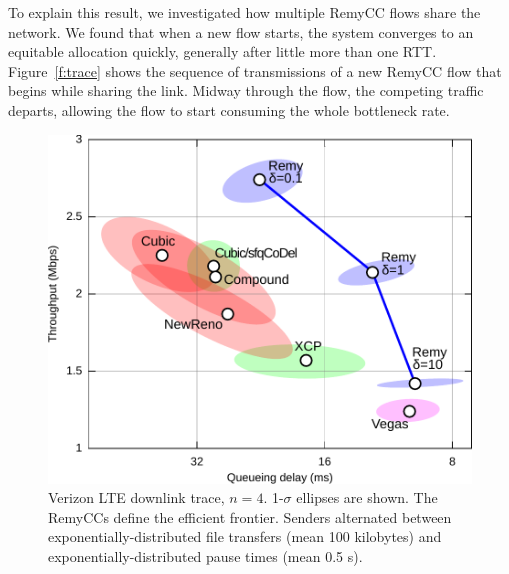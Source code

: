 To explain this result, we investigated how multiple RemyCC flows
share the network. We found that when a new flow starts, the system
converges to an equitable allocation quickly, generally after little
more than one RTT. Figure~\ref{f:trace} shows the sequence of
transmissions of a new RemyCC flow that begins while sharing the link.
Midway through the flow, the competing traffic departs, allowing
the flow to start consuming the whole bottleneck rate.

\begin{figure}
\includegraphics[width=\columnwidth]{vzw-4-final.pdf}
\caption{Verizon LTE downlink trace, $n = 4$. 1-$\sigma$ ellipses are shown.
The RemyCCs define the efficient frontier. Senders alternated between
exponentially-distributed file transfers (mean 100 kilobytes) and
exponentially-distributed pause times (mean 0.5 s).}
\label{f:verizon4}

\end{figure}


